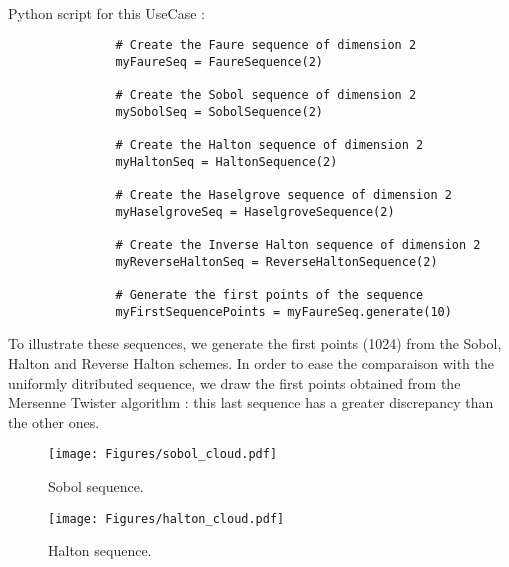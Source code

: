              \textspace\\
             Python  script for this UseCase :

             \begin{lstlisting}
               # Create the Faure sequence of dimension 2
               myFaureSeq = FaureSequence(2)

               # Create the Sobol sequence of dimension 2
               mySobolSeq = SobolSequence(2)

               # Create the Halton sequence of dimension 2
               myHaltonSeq = HaltonSequence(2)

               # Create the Haselgrove sequence of dimension 2
               myHaselgroveSeq = HaselgroveSequence(2)

               # Create the Inverse Halton sequence of dimension 2
               myReverseHaltonSeq = ReverseHaltonSequence(2)

               # Generate the first points of the sequence
               myFirstSequencePoints = myFaureSeq.generate(10)
             \end{lstlisting}


             To illustrate these sequences, we generate the first points (1024) from the Sobol, Halton and Reverse Halton schemes. In order to ease the comparaison with the uniformly ditributed sequence, we draw the first points obtained from the Mersenne Twister algorithm : this last sequence has a greater discrepancy than the other ones.



             \begin{figure}[H]
               \begin{minipage}{10cm}
                 \begin{center}
                   \texttt{[image: Figures/sobol\_cloud.pdf]}
                   \caption{Sobol sequence.}
                   \label{Sobol}
                 \end{center}
               \end{minipage}
               \hfill
               \begin{minipage}{10cm}
                 \begin{center}
                   \texttt{[image: Figures/halton\_cloud.pdf]}
                   \caption{Halton sequence.}
                   \label{Halton}
                 \end{center}
               \end{minipage}
             \end{figure}


